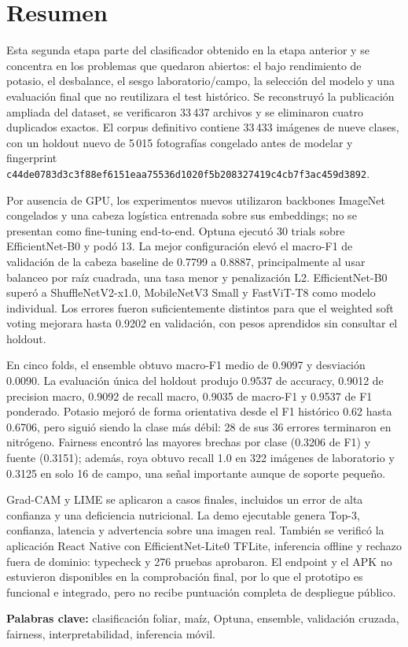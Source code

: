 \section*{Resumen}

Esta segunda etapa parte del clasificador obtenido en la etapa anterior y se
concentra en los problemas que quedaron abiertos: el bajo rendimiento de
potasio, el desbalance, el sesgo laboratorio/campo, la selección del modelo y
una evaluación final que no reutilizara el test histórico. Se reconstruyó la
publicación ampliada del dataset, se verificaron 33\,437 archivos y se
eliminaron cuatro duplicados exactos. El corpus definitivo contiene 33\,433
imágenes de nueve clases, con un holdout nuevo de 5\,015 fotografías congelado
antes de modelar y fingerprint
\texttt{c44de0783d3c3f88ef6151eaa75536d1020f5b208327419c4cb7f3ac459d3892}.

Por ausencia de GPU, los experimentos nuevos utilizaron backbones ImageNet
congelados y una cabeza logística entrenada sobre sus embeddings; no se
presentan como fine-tuning end-to-end. Optuna ejecutó 30 trials sobre
EfficientNet-B0 y podó 13. La mejor configuración elevó el macro-F1 de
validación de la cabeza baseline de 0.7799 a 0.8887, principalmente al usar
balanceo por raíz cuadrada, una tasa menor y penalización L2.
EfficientNet-B0 superó a ShuffleNetV2-x1.0, MobileNetV3 Small y FastViT-T8 como
modelo individual. Los errores fueron suficientemente distintos para que el
weighted soft voting mejorara hasta 0.9202 en validación, con pesos aprendidos
sin consultar el holdout.

En cinco folds, el ensemble obtuvo macro-F1 medio de 0.9097 y desviación 0.0090.
La evaluación única del holdout produjo 0.9537 de accuracy, 0.9012 de precision
macro, 0.9092 de recall macro, 0.9035 de macro-F1 y 0.9537 de F1 ponderado.
Potasio mejoró de forma orientativa desde el F1 histórico 0.62 hasta 0.6706,
pero siguió siendo la clase más débil: 28 de sus 36 errores terminaron en
nitrógeno. Fairness encontró las mayores brechas por clase (0.3206 de F1) y
fuente (0.3151); además, roya obtuvo recall 1.0 en 322 imágenes de laboratorio
y 0.3125 en solo 16 de campo, una señal importante aunque de soporte pequeño.

Grad-CAM y LIME se aplicaron a casos finales, incluidos un error de alta
confianza y una deficiencia nutricional. La demo ejecutable genera Top-3,
confianza, latencia y advertencia sobre una imagen real. También se verificó la
aplicación React Native con EfficientNet-Lite0 TFLite, inferencia offline y
rechazo fuera de dominio: typecheck y 276 pruebas aprobaron. El endpoint y el
APK no estuvieron disponibles en la comprobación final, por lo que el
prototipo es funcional e integrado, pero no recibe puntuación completa de
despliegue público.

\noindent\textbf{Palabras clave:} clasificación foliar, maíz, Optuna, ensemble,
validación cruzada, fairness, interpretabilidad, inferencia móvil.
